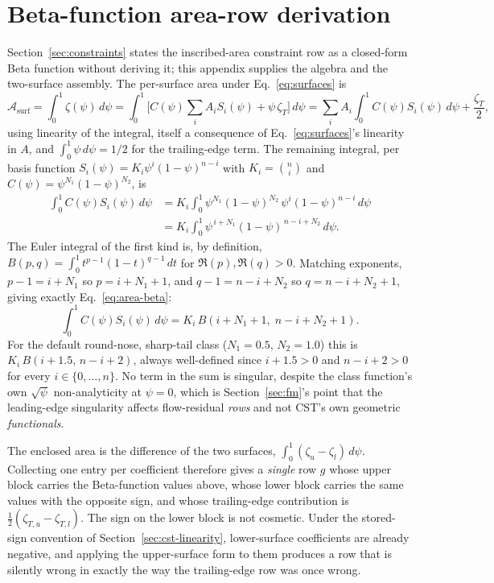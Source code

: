 \section{Beta-function area-row derivation}
\label{app:area}

Section~\ref{sec:constraints} states the inscribed-area constraint row as a
closed-form Beta function without deriving it; this appendix supplies the
algebra and the two-surface assembly. The per-surface area under
Eq.~\eqref{eq:surfaces} is
\begin{equation}
  \mathcal{A}_{\text{surf}} = \int_0^1 \zeta(\psi)\,d\psi
  = \int_0^1 \Big[C(\psi)\sum_i A_i S_i(\psi) + \psi\,\zeta_T\Big]\,d\psi
  = \sum_i A_i \int_0^1 C(\psi)S_i(\psi)\,d\psi + \frac{\zeta_T}{2},
\end{equation}
using linearity of the integral, itself a consequence of
Eq.~\eqref{eq:surfaces}'s linearity in $A$, and $\int_0^1\psi\,d\psi=1/2$ for
the trailing-edge term. The remaining integral, per basis function
$S_i(\psi)=K_i\psi^i(1-\psi)^{n-i}$ with $K_i=\binom{n}{i}$ and
$C(\psi)=\psi^{N_1}(1-\psi)^{N_2}$, is
\begin{align}
  \int_0^1 C(\psi)S_i(\psi)\,d\psi
    &= K_i \int_0^1 \psi^{N_1}(1-\psi)^{N_2}\,\psi^i(1-\psi)^{n-i}\,d\psi \\
    &= K_i \int_0^1 \psi^{\,i+N_1}(1-\psi)^{\,n-i+N_2}\,d\psi.
\end{align}
The Euler integral of the first kind is, by definition,
$B(p,q) = \int_0^1 t^{p-1}(1-t)^{q-1}\,dt$ for $\Re(p),\Re(q)>0$. Matching
exponents, $p-1 = i+N_1$ so $p = i+N_1+1$, and $q-1 = n-i+N_2$ so
$q = n-i+N_2+1$, giving exactly Eq.~\eqref{eq:area-beta}:
\begin{equation}
  \int_0^1 C(\psi)S_i(\psi)\,d\psi = K_i\,B(i+N_1+1,\;n-i+N_2+1).
\end{equation}
For the default round-nose, sharp-tail class ($N_1=0.5$, $N_2=1.0$) this is
$K_i\,B(i+1.5,\,n-i+2)$, always well-defined since $i+1.5>0$ and $n-i+2>0$ for
every $i\in\{0,\dots,n\}$. No term in the sum is singular, despite the class
function's own $\sqrt\psi$ non-analyticity at $\psi=0$, which is
Section~\ref{sec:fm}'s point that the leading-edge singularity affects
flow-residual \emph{rows} and not CST's own geometric \emph{functionals}.

The enclosed area is the difference of the two surfaces,
$\int_0^1(\zeta_u-\zeta_l)\,d\psi$. Collecting one entry per coefficient
therefore gives a \emph{single} row $g$ whose upper block carries the
Beta-function values above, whose lower block carries the same values with the
opposite sign, and whose trailing-edge contribution is
$\tfrac12(\zeta_{T,u}-\zeta_{T,l})$. The sign on the lower block is not
cosmetic. Under the stored-sign convention of
Section~\ref{sec:cst-linearity}, lower-surface coefficients are already
negative, and applying the upper-surface form to them produces a row that is
silently wrong in exactly the way the trailing-edge row was once wrong.

